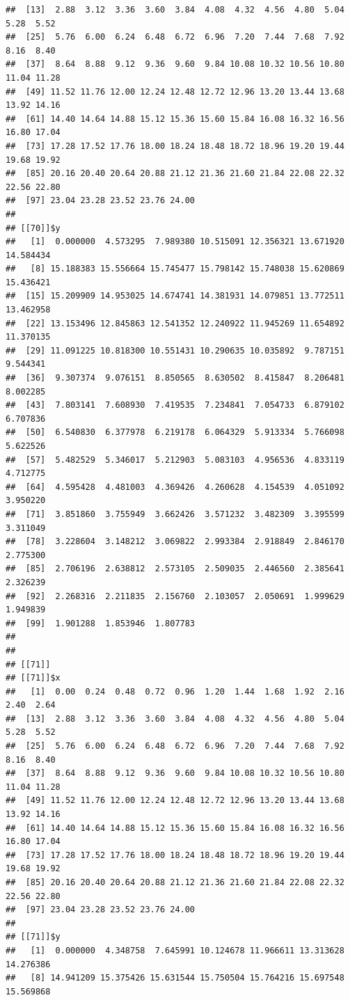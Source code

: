 \documentclass[
  ignorenonframetext,
]{beamer}
\begin{document}
\begin{frame}[fragile]{}
\begin{verbatim}
##  [13]  2.88  3.12  3.36  3.60  3.84  4.08  4.32  4.56  4.80  5.04  5.28  5.52
##  [25]  5.76  6.00  6.24  6.48  6.72  6.96  7.20  7.44  7.68  7.92  8.16  8.40
##  [37]  8.64  8.88  9.12  9.36  9.60  9.84 10.08 10.32 10.56 10.80 11.04 11.28
##  [49] 11.52 11.76 12.00 12.24 12.48 12.72 12.96 13.20 13.44 13.68 13.92 14.16
##  [61] 14.40 14.64 14.88 15.12 15.36 15.60 15.84 16.08 16.32 16.56 16.80 17.04
##  [73] 17.28 17.52 17.76 18.00 18.24 18.48 18.72 18.96 19.20 19.44 19.68 19.92
##  [85] 20.16 20.40 20.64 20.88 21.12 21.36 21.60 21.84 22.08 22.32 22.56 22.80
##  [97] 23.04 23.28 23.52 23.76 24.00
## 
## [[70]]$y
##   [1]  0.000000  4.573295  7.989380 10.515091 12.356321 13.671920 14.584434
##   [8] 15.188383 15.556664 15.745477 15.798142 15.748038 15.620869 15.436421
##  [15] 15.209909 14.953025 14.674741 14.381931 14.079851 13.772511 13.462958
##  [22] 13.153496 12.845863 12.541352 12.240922 11.945269 11.654892 11.370135
##  [29] 11.091225 10.818300 10.551431 10.290635 10.035892  9.787151  9.544341
##  [36]  9.307374  9.076151  8.850565  8.630502  8.415847  8.206481  8.002285
##  [43]  7.803141  7.608930  7.419535  7.234841  7.054733  6.879102  6.707836
##  [50]  6.540830  6.377978  6.219178  6.064329  5.913334  5.766098  5.622526
##  [57]  5.482529  5.346017  5.212903  5.083103  4.956536  4.833119  4.712775
##  [64]  4.595428  4.481003  4.369426  4.260628  4.154539  4.051092  3.950220
##  [71]  3.851860  3.755949  3.662426  3.571232  3.482309  3.395599  3.311049
##  [78]  3.228604  3.148212  3.069822  2.993384  2.918849  2.846170  2.775300
##  [85]  2.706196  2.638812  2.573105  2.509035  2.446560  2.385641  2.326239
##  [92]  2.268316  2.211835  2.156760  2.103057  2.050691  1.999629  1.949839
##  [99]  1.901288  1.853946  1.807783
## 
## 
## [[71]]
## [[71]]$x
##   [1]  0.00  0.24  0.48  0.72  0.96  1.20  1.44  1.68  1.92  2.16  2.40  2.64
##  [13]  2.88  3.12  3.36  3.60  3.84  4.08  4.32  4.56  4.80  5.04  5.28  5.52
##  [25]  5.76  6.00  6.24  6.48  6.72  6.96  7.20  7.44  7.68  7.92  8.16  8.40
##  [37]  8.64  8.88  9.12  9.36  9.60  9.84 10.08 10.32 10.56 10.80 11.04 11.28
##  [49] 11.52 11.76 12.00 12.24 12.48 12.72 12.96 13.20 13.44 13.68 13.92 14.16
##  [61] 14.40 14.64 14.88 15.12 15.36 15.60 15.84 16.08 16.32 16.56 16.80 17.04
##  [73] 17.28 17.52 17.76 18.00 18.24 18.48 18.72 18.96 19.20 19.44 19.68 19.92
##  [85] 20.16 20.40 20.64 20.88 21.12 21.36 21.60 21.84 22.08 22.32 22.56 22.80
##  [97] 23.04 23.28 23.52 23.76 24.00
## 
## [[71]]$y
##   [1]  0.000000  4.348758  7.645991 10.124678 11.966611 13.313628 14.276386
##   [8] 14.941209 15.375426 15.631544 15.750504 15.764216 15.697548 15.569868

\end{verbatim}
\end{frame}
\end{document}
